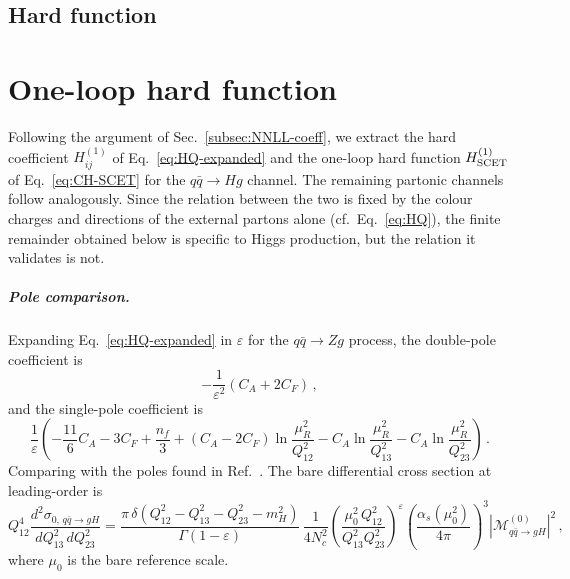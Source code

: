 \section{Hard function}

\chapter{One-loop hard function}
\label{ap:H1-extraction}

Following the argument of Sec.~\ref{subsec:NNLL-coeff}, we extract the
hard coefficient $H^{(1)}_{ij}$ of Eq.~\eqref{eq:HQ-expanded} and the
one-loop hard function $H^{(1)}_{\rm SCET}$ of Eq.~\eqref{eq:CH-SCET}
for the $q\bar q\to Hg$ channel. The remaining partonic channels follow
analogously. Since the relation between the two is fixed by the colour
charges and directions of the external partons alone
(cf.\ Eq.~\eqref{eq:HQ}), the finite remainder obtained below is
specific to Higgs production, but the relation it validates is not.

\paragraph{Pole comparison.} Expanding Eq.~\eqref{eq:HQ-expanded} in $\varepsilon$ for the
$q\bar{q}\to Zg$ process, the double-pole
coefficient is
\begin{equation}
  \label{eq:H-pole2}
  -\frac{1}{\varepsilon^2}(C_A+2C_F)\,,
\end{equation}
and the single-pole coefficient is
\begin{equation}
  \label{eq:H-pole1}
  \frac{1}{\varepsilon}\!\left(
  -\frac{11}{6}C_A-3C_F+\frac{n_f}{3}
  +(C_A-2C_F)\ln\frac{\mu_R^2}{Q_{12}^2}
  -C_A\ln\frac{\mu_R^2}{Q_{13}^2}
  -C_A\ln\frac{\mu_R^2}{Q_{23}^2}
  \right)\,.
\end{equation}
Comparing with the poles found in Ref.~\cite{Ravindran:2002dc}. The bare differential cross section at leading-order is
\begin{equation}
\label{eq:LO-bare}
  Q_{12}^4\frac{d^2\sigma_{0,\,q\bar{q}\to g H}}{dQ_{13}^2\,dQ_{23}^2} =
  \frac{\pi\,\delta(Q_{12}^2-Q_{13}^2-Q_{23}^2-m_H^2)}{\Gamma(1-\varepsilon)}
  \,\frac{1}{4N_c^2}
  \left(\frac{\mu_0^2\,Q_{12}^2}{Q_{13}^2Q_{23}^2}\right)^\varepsilon
 \left( \frac{\alpha_s(\mu_0^2)}{4\pi}\right)^3
 |\mathcal{M}^{(0)}_{q\bar{q}\to g H}|^2\,,
\end{equation}
where $\mu_0$ is the bare reference scale.

